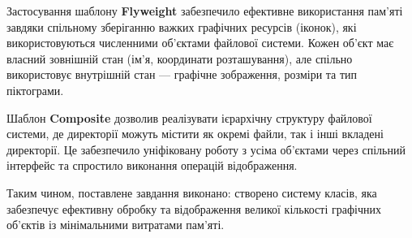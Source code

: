 \documentclass[12pt,a4paper]{article}
\begin{document}
\setlength{\parindent}{1.5em}

Застосування шаблону \textbf{Flyweight} забезпечило ефективне використання
пам'яті завдяки спільному зберіганню важких графічних ресурсів (іконок),
які використовуються численними об’єктами файлової системи.
Кожен об’єкт має власний зовнішній стан (ім’я, координати розташування),
але спільно використовує внутрішній стан — графічне зображення, розміри та тип піктограми.

Шаблон \textbf{Composite} дозволив реалізувати ієрархічну структуру файлової системи,
де директорії можуть містити як окремі файли, так і інші вкладені директорії.
Це забезпечило уніфіковану роботу з усіма об’єктами через спільний інтерфейс
та спростило виконання операцій відображення.

Таким чином, поставлене завдання виконано: створено систему класів, яка
забезпечує ефективну обробку та відображення великої кількості графічних об’єктів
із мінімальними витратами пам’яті.
\end{document}

